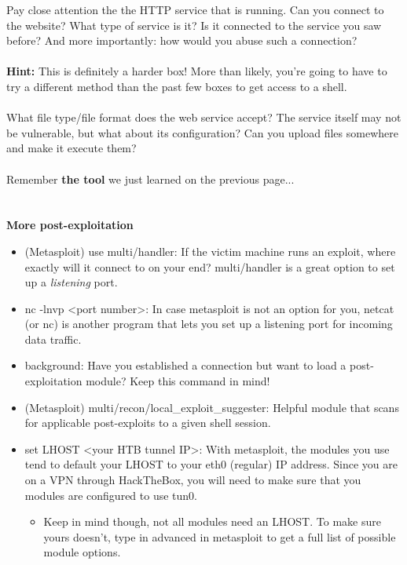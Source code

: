 \documentclass[a4paper,11pt]{article}
\renewcommand{\tt}[2][tt]{\textcolor{#1}{\ttfamily #2}}%
\begin{document}
Pay close attention the the HTTP service that is running. Can you connect to the website? What type of service is it? Is it connected to the service you saw before? And more importantly: how would you abuse such a connection?
\\
\\
{\bfseries Hint:}
This is definitely a harder box! More than likely, you're going to have to try a different method than the past few boxes to get access to a shell. 
\\
\\
What file type/file format does the web service accept? The service itself may not be vulnerable, but what about its configuration? Can you upload files somewhere and make it execute them? 
\\
\\
Remember {\bfseries the tool} we just learned on the previous page...
\\
\\
\\
{\bfseries More post-exploitation}
\begin{itemize}
    \item (Metasploit) \tt{use multi/handler}: If the victim machine runs an exploit, where exactly will it connect to on your end? \tt{multi/handler} is a great option to set up a \textit{listening} port.
    \item \tt{nc -lnvp <port number>}: In case metasploit is not an option for you, \tt{netcat} (or \tt{nc}) is another program that lets you set up a listening port for incoming data traffic.
    \item \tt{background}: Have you established a connection but want to load a post-exploitation module? Keep this command in mind!
    \item (Metasploit) \tt{multi/recon/local\_exploit\_suggester}: Helpful module that scans for applicable post-exploits to a given shell session.
    \item \tt{set LHOST <your HTB tunnel IP>}: With metasploit, the modules you use tend to default your \tt{LHOST} to your \tt{eth0} (regular) IP address. Since you are on a VPN through HackTheBox, you will need to make sure that you modules are configured to use tun0.
    \begin{itemize}
        \item Keep in mind though, not all modules need an LHOST. To make sure yours doesn't, type in \tt{advanced} in metasploit to get a full list of possible module options.
    \end{itemize}
\end{itemize}
\pagebreak
\end{document}
